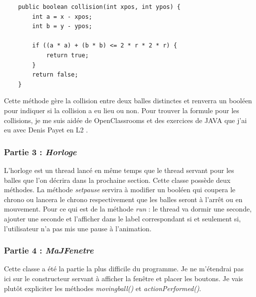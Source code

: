 \documentclass{article}
\begin{document}
\begin{verbatim}
	public boolean collision(int xpos, int ypos) {
		int a = x - xpos;
		int b = y - ypos;

		if ((a * a) + (b * b) <= 2 * r * 2 * r) {
			return true;
		}
		return false;
	}
\end{verbatim}

Cette méthode gère la collision entre deux balles distinctes et renverra un booléen pour indiquer si la collision a eu lieu ou non. Pour trouver la formule pour les collisions, je me suis aidée de OpenClassrooms \cite{OC_cercle} et des exercices de JAVA que j'ai eu avec Denis Payet en L2 \cite{DP_JAVA}.



\subsubsection{Partie 3 : \textit{Horloge}}

L'horloge est un thread lancé en même temps que le thread servant pour les balles que l'on décrira dans la prochaine section.
Cette classe possède deux méthodes. La méthode \textit{setpause} servira à modifier un booléen qui coupera le chrono ou lancera le chrono respectivement que les balles seront à l'arrêt ou en mouvement.
Pour ce qui est de la méthode \textit{run} : le thread va dormir une seconde, ajouter une seconde et l'afficher dans le label correspondant si et seulement si, l'utilisateur n'a pas mis une pause à l'animation.

\subsubsection{Partie 4  : \textit{MaJFenetre}}

Cette classe a été la partie la plus difficile du programme. Je ne m'étendrai pas ici sur le constructeur servant à afficher la fenêtre et placer les boutons. Je vais plutôt expliciter les méthodes \textit{movingball()} et \textit{actionPerformed()}.
\end{document}
